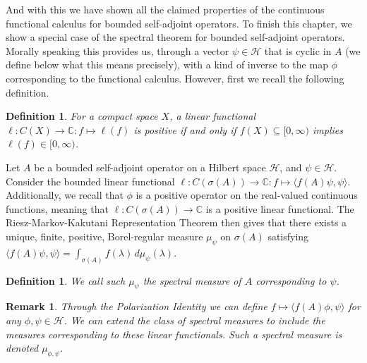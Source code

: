 \documentclass[12pt,oneside]{report}
\newtheorem{defn}[thm]{Definition}
\newtheorem{rem}[thm]{Remark}
\begin{document}
And with this we have shown all the claimed properties of the continuous functional calculus for bounded self-adjoint operators. To finish this chapter, we show a special case of the spectral theorem for bounded self-adjoint operators. Morally speaking this provides us, through a vector $\psi \in \mathscr{H}$ that is cyclic in $A$ (we define below what this means precisely), with a kind of inverse to the map $\phi$ corresponding to the functional calculus. However, first we recall the following definition.

\begin{defn}
    \cite{rudin_real_2013} For a compact space $X$, a linear functional $\ell: C(X) \to \mathbb{C}: f \mapsto \ell(f)$ is positive if and only if $f(X) \subseteq [0,\infty)$ implies $\ell(f) \in [0, \infty)$.
\end{defn}


Let $A$ be a bounded self-adjoint operator on a Hilbert space $\mathscr{H}$, and $\psi \in \mathscr{H}$. Consider the bounded linear functional $\ell: C(\sigma(A)) \to \mathbb{C}: f \mapsto \langle f(A) \psi, \psi \rangle$. Additionally, we recall that $\phi$ is a positive operator on the real-valued continuous functions, meaning that $\ell: C(\sigma(A)) \to \mathbb{C}$ is a positive linear functional. The Riesz-Markov-Kakutani Representation Theorem then gives that there exists a unique, finite, positive, Borel-regular measure $\mu_{\psi}$ on $\sigma(A)$ satisfying $\langle f(A)\psi, \psi \rangle = \int _{\sigma(A)} f(\lambda) \, d\mu_{\psi}(\lambda)$. 


\begin{defn}
    We call such $\mu_{\psi}$ the spectral measure of $A$ corresponding to $\psi$.
\end{defn}

\begin{rem}\label{extended-spectral-measures}
    Through the Polarization Identity we can define $f \mapsto \langle f(A)\phi,\psi \rangle$  for any $\phi, \psi \in \mathscr{H}$. We can extend the class of spectral measures to include the measures corresponding to these linear functionals. Such a spectral measure is denoted $\mu_{\phi,\psi}$.
\end{rem}
\end{document}
